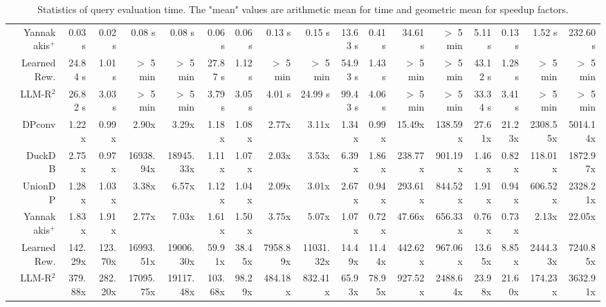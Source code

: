 \begin{table}
\begin{tiny}
\begin{tabular}{cr|rrrr|rrrr|rrrr|rrrr}
        & Yannakakis$^+$  & 0.03 s & 0.02 s & 0.08 s & 0.08 s & 0.06 s & 0.06 s & 0.13 s & 0.15 s & 13.63 s & 0.41 s & 34.61 s & $>$ 5 min & 5.11 s & 0.13 s & 1.52 s & 232.60 s \\
        & LearnedRew.  & 24.84 s & 1.01 s & $>$ 5 min & $>$ 5 min & 27.87 s & 1.12 s & $>$ 5 min & $>$ 5 min & 54.93 s & 1.43 s & $>$ 5 min & $>$ 5 min & 43.12 s & 1.28 s & $>$ 5 min & $>$ 5 min \\
        & LLM-R$^2$  & 26.82 s & 3.03 s & $>$ 5 min & $>$ 5 min & 3.79 s & 3.05 s & 4.01 s & 24.99 s & 99.43 s & 4.06 s & $>$ 5 min & $>$ 5 min & 33.34 s & 3.41 s & $>$ 5 min & $>$ 5 min \\
    \hline
        & DPconv  & 1.22x & 0.99x & 2.90x & 3.29x & 1.18x & 1.08x & 2.77x & 3.11x & 1.34x & 0.99x & 15.49x & 138.59x & 27.61x & 21.23x & 2308.55x & 5014.14x \\
        & DuckDB  & 2.75x & 0.97x & 16938.94x & 18945.33x & 1.11x & 1.07x & 2.03x & 3.53x & 6.39x & 1.86x & 238.77x & 901.19x & 1.46x & 0.82x & 118.01x & 1872.97x \\
        & UnionDP  & 1.28x & 1.03x & 3.38x & 6.57x & 1.12x & 1.04x & 2.09x & 3.01x & 2.67x & 0.94x & 293.61x & 844.52x & 1.91x & 0.94x & 606.52x & 2328.21x \\
        & Yannakakis$^+$  & 1.83x & 1.91x & 2.77x & 7.03x & 1.61x & 1.50x & 3.75x & 5.07x & 1.07x & 0.72x & 47.66x & 656.33x & 0.76x & 0.73x & 2.13x & 22.05x \\
        & LearnedRew.  & 142.29x & 123.70x & 16993.51x & 19006.30x & 59.91x & 38.45x & 7958.89x & 11031.32x & 14.49x & 11.44x & 442.62x & 967.06x & 13.65x & 8.85x & 2444.33x & 7240.85x \\
        & LLM-R$^2$  & 379.88x & 282.20x & 17095.75x & 19117.48x & 103.68x & 98.29x & 484.18x & 832.41x & 65.93x & 78.95x & 927.52x & 2488.64x & 23.98x & 21.60x & 174.23x & 3632.91x \\
    \hline
\end{tabular}

    \end{tiny}
    \caption{Statistics of query evaluation time. The "mean" values are arithmetic mean for time and geometric mean for speedup factors.}
    \vspace{-1\baselineskip}
    \label{tab:stats-new}
\end{table}
